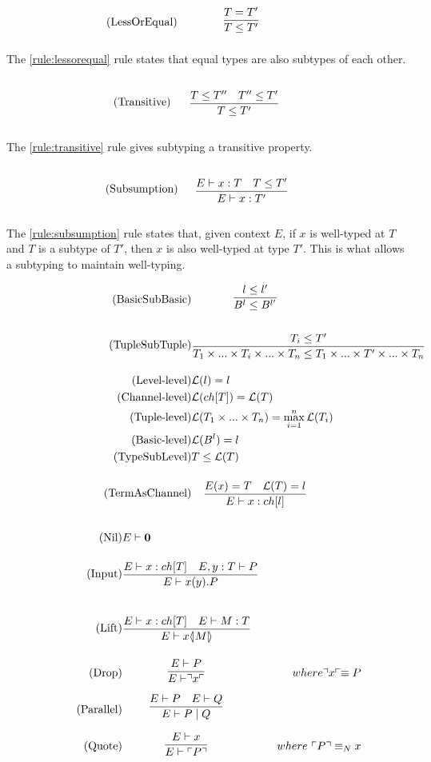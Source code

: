 \begin{align*}
\tag{LessOrEqual}\label{rule:lessorequal} &\infrule{T=T'}{T\leq T'}
\end{align*}

The \ref{rule:lessorequal} rule states that equal types are also subtypes of each other.

\begin{align*}
\tag{Transitive}\label{rule:transitive} &\infrule{T\leq T''\quad T''\leq T'}{T\leq T'}
\end{align*}

The \ref{rule:transitive} rule gives subtyping a transitive property.

\begin{align*}
\tag{Subsumption}\label{rule:subsumption} &\infrule{E\vdash x:T\quad T\leq T'}{E\vdash x:T'}
\end{align*}

The \ref{rule:subsumption} rule states that, given context $E$, if $x$ is well-typed at $T$ and $T$ is a subtype of $T'$, then $x$ is also well-typed at type $T'$. This is what allows a subtyping to maintain well-typing.

\begin{align*}
\tag{BasicSubBasic} &\infrule{l\leq l'}{B^l\leq B^{l'}}\\
\tag{TupleSubTuple} &\infrule{T_i\leq T'}{T_1\times...\times T_i\times...\times T_n\leq T_1\times...\times T'\times...\times T_n}\\
\tag{Level-level} &\level{l}=l\\
\tag{Channel-level} &\level{ch[T]} = \level{T}\\
\tag{Tuple-level} &\level{T_1\times...\times T_n}=\max_{i=1}^{n}{\level{T_i}}\\
\tag{Basic-level} &\level{B^l}=l\\
\tag{TypeSubLevel} &T\leq \level{T}\\
\tag{TermAsChannel} &\infrule{E(x)=T\quad \level{T}=l}{E\vdash x:ch[l]}
\end{align*}

\begin{align*}
\tag{Nil} &E \vdash \nil\\
\tag{Input} &\infrule{E\vdash x:ch[T]\quad E,y:T\vdash P}{E \vdash \inp{x}{y}P}\\
\tag{Lift} &\infrule{E\vdash x:ch[T]\quad E \vdash M:T}{E\vdash \lift{x}{M}}\\
\tag{Drop} &\infrule{E \vdash P}{E\vdash \drop{x}}& where \drop{x} \equiv P\\
\tag{Parallel} &\infrule{E\vdash P \quad E \vdash Q}{E \vdash P \para Q}\\
\tag{Quote} &\infrule{E \vdash x}{E\vdash \quot{P}}& where\ \quot{P} \equiv_N x
\end{align*}

